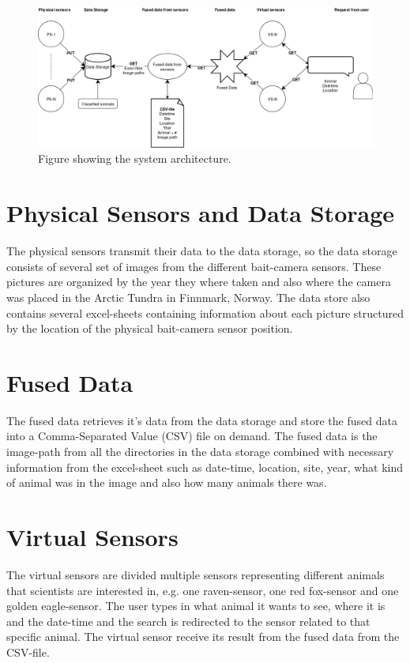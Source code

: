 \documentclass[USenglish]{uit-thesis}
\begin{document}
\begin{figure}
\centering
\includegraphics[width=\textwidth]{Architecture2.png}
\caption{Figure showing the system architecture.}
\label{fig:architecture}
\end{figure}


\section{Physical Sensors and Data Storage}
The physical sensors transmit their data to the data storage, so the data storage consists of several set of images from the different bait-camera sensors. These pictures are organized by the year they where taken and also where the camera was placed in the Arctic Tundra in Finnmark, Norway. 
The data store also contains several excel-sheets containing information about each picture structured by the location of the physical bait-camera sensor position.

\section{Fused Data}
The fused data retrieves it's data from the data storage and store the fused data into a Comma-Separated Value (CSV) file on demand. The fused data is the image-path from all the directories in the data storage combined with necessary information from the excel-sheet such as date-time, location, site, year, what kind of animal was in the image and also how many animals there was.

\section{Virtual Sensors}
The virtual sensors are divided multiple sensors representing different animals that scientists are interested in, e.g. one raven-sensor, one red fox-sensor and one golden eagle-sensor.
The user types in what animal it wants to see, where it is and the date-time and the search is redirected to the sensor related to that specific animal. The virtual sensor receive its result from the fused data from the CSV-file.
\end{document}
